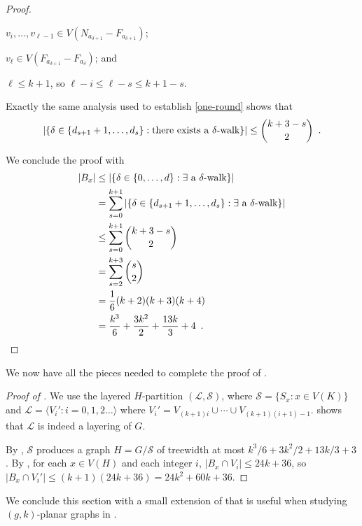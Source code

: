 \documentclass{patmorin}
\newcommand{\treewidth}{\ensuremath{k^3/6 + 3k^2/2 + 13k/3 + 3}}
\begin{document}
\begin{proof}
\begin{compactenum}[(i)]
    \item $v_i,\ldots,v_{\ell-1}\in V(N_{a_{\delta+1}}-F_{a_{\delta+1}})$;
    
    \item $v_\ell\in V(F_{a_{\delta+1}}-F_{a_\delta})$; and
    
    \item $\ell\le k+1$, so $\ell-i \le \ell-s \le k+1-s$.
  \end{compactenum}
  Exactly the same analysis used to establish \eqref{one-round} shows that
  \begin{equation}
     |\{\delta\in\{d_{s+1}+1,\ldots,d_s\}:  \mbox{there exists a $\delta$-walk} \}| \le \binom{k+3-s}{2} \enspace . \eqlabel{one-round-s}
  \end{equation}

  We conclude the proof with 
  \begin{align*}
    |B_x| & \le |\{\delta\in\{0,\ldots,d\}:  \mbox{$\exists$ a $\delta$-walk} \}| \\
      & = \sum_{s=0}^{k+1}|\{\delta\in\{d_{s+1}+1,\ldots,d_s\}:  \mbox{$\exists$ a $\delta$-walk} \}| \\
      & \le\sum_{s=0}^{k+1} \binom{k+3-s}{2} \\
      & = \sum_{s=2}^{k+3} \binom{s}{2} \\
      & = \frac{1}{6}(k+2)(k+3)(k+4) \\
      & = \frac{k^3}{6} + \frac{3k^2}{2} + \frac{13k}{3} + 4  \enspace . \qedhere
  \end{align*}
\end{proof}

We now have all the pieces needed to complete the proof of .

\begin{proof}[Proof of ]
  We use the layered $H$-partition $(\mathcal{L}, \mathcal{S})$, where $\mathcal{S}=\{S_x:x\in V(K)\}$ and $\mathcal{L}=\langle V_i': i=0,1,2\ldots\rangle$ where $V_i' = V_{(k+1)i}\cup\cdots\cup V_{(k+1)(i+1)-1}$.   shows that $\mathcal{L}$ is indeed a layering of $G$.

  By , $\mathcal{S}$ produces a graph $H=G/\mathcal{S}$ of treewidth at most $\treewidth$.  By , for each $x\in V(H)$ and each integer $i$, $|B_x\cap V_i|\le 24k+36$, so $|B_x\cap V_i'|\le (k+1)(24k + 36) = 24k^2+60k+36$. 
\end{proof}

We conclude this section with a small extension of  that is useful when studying $(g,k)$-planar graphs in .
\end{document}
